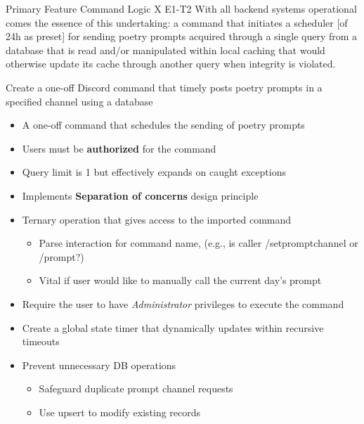 \documentclass[7px]{article}
\begin{document}
\frontmatter
{Primary Feature}
{Command Logic}
{X}
{E1-T2}
{With all backend systems operational comes the essence of this undertaking: a command that initiates a scheduler [of 24h as preset] for sending poetry prompts acquired through a single query from a database that is read and/or manipulated within local caching that would otherwise update its cache through another query when integrity is violated.}

\strategy
{
  Create a one-off Discord command that timely posts poetry prompts in a specified channel using a database
}
{
  \begin{enumerate}
    \small
    \begin{itemize}[label=$\multimapdotinv$, leftmargin=1.7mm]
      \item A one-off command that schedules the sending of poetry prompts
      \item Users must be \textbf{authorized} for the command
      \item Query limit is 1 but effectively expands on caught exceptions
      \item Implements \textbf{Separation of concerns} design principle
    \end{itemize}
    \normalsize
\end{enumerate}
}
{
  \small
  \begin{itemize}[label=$\multimapdotinv$]
    \item Ternary operation that gives access to the imported command
      \footnotesize{
        \begin{itemize}
          \item Parse interaction for command name, (e.g., is caller /setpromptchannel or /prompt?)
          \item Vital if user would like to manually call the current day's prompt
        \end{itemize}
      }
    \item Require the user to have \textit{Administrator} privileges to execute the command
    \item Create a global state timer that dynamically updates within recursive timeouts
    \item Prevent unnecessary DB operations
      \begin{itemize}
        \item Safeguard duplicate prompt channel requests
        \item Use upsert to modify existing records 
      \end{itemize}
  \end{itemize}
  \normalsize
}
\end{document}
